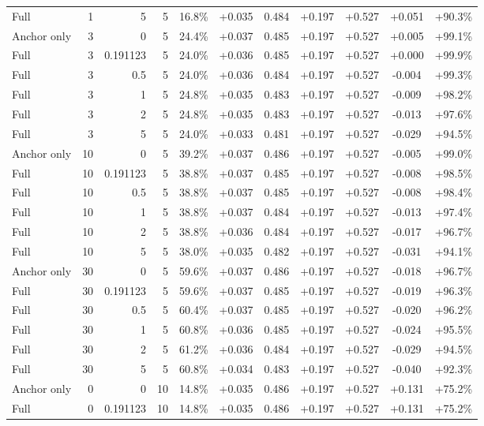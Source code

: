 \begin{table}[htbp]
\begin{tabular}{lrrrccccccc}
Full & 1 & 5 & 5 & 16.8\% & +0.035 & 0.484 & +0.197 & +0.527 & +0.051 & +90.3\% \\
Anchor only & 3 & 0 & 5 & 24.4\% & +0.037 & 0.485 & +0.197 & +0.527 & +0.005 & +99.1\% \\
Full & 3 & 0.191123 & 5 & 24.0\% & +0.036 & 0.485 & +0.197 & +0.527 & +0.000 & +99.9\% \\
Full & 3 & 0.5 & 5 & 24.0\% & +0.036 & 0.484 & +0.197 & +0.527 & -0.004 & +99.3\% \\
Full & 3 & 1 & 5 & 24.8\% & +0.035 & 0.483 & +0.197 & +0.527 & -0.009 & +98.2\% \\
Full & 3 & 2 & 5 & 24.8\% & +0.035 & 0.483 & +0.197 & +0.527 & -0.013 & +97.6\% \\
Full & 3 & 5 & 5 & 24.0\% & +0.033 & 0.481 & +0.197 & +0.527 & -0.029 & +94.5\% \\
Anchor only & 10 & 0 & 5 & 39.2\% & +0.037 & 0.486 & +0.197 & +0.527 & -0.005 & +99.0\% \\
Full & 10 & 0.191123 & 5 & 38.8\% & +0.037 & 0.485 & +0.197 & +0.527 & -0.008 & +98.5\% \\
Full & 10 & 0.5 & 5 & 38.8\% & +0.037 & 0.485 & +0.197 & +0.527 & -0.008 & +98.4\% \\
Full & 10 & 1 & 5 & 38.8\% & +0.037 & 0.484 & +0.197 & +0.527 & -0.013 & +97.4\% \\
Full & 10 & 2 & 5 & 38.8\% & +0.036 & 0.484 & +0.197 & +0.527 & -0.017 & +96.7\% \\
Full & 10 & 5 & 5 & 38.0\% & +0.035 & 0.482 & +0.197 & +0.527 & -0.031 & +94.1\% \\
Anchor only & 30 & 0 & 5 & 59.6\% & +0.037 & 0.486 & +0.197 & +0.527 & -0.018 & +96.7\% \\
Full & 30 & 0.191123 & 5 & 59.6\% & +0.037 & 0.485 & +0.197 & +0.527 & -0.019 & +96.3\% \\
Full & 30 & 0.5 & 5 & 60.4\% & +0.037 & 0.485 & +0.197 & +0.527 & -0.020 & +96.2\% \\
Full & 30 & 1 & 5 & 60.8\% & +0.036 & 0.485 & +0.197 & +0.527 & -0.024 & +95.5\% \\
Full & 30 & 2 & 5 & 61.2\% & +0.036 & 0.484 & +0.197 & +0.527 & -0.029 & +94.5\% \\
Full & 30 & 5 & 5 & 60.8\% & +0.034 & 0.483 & +0.197 & +0.527 & -0.040 & +92.3\% \\
Anchor only & 0 & 0 & 10 & 14.8\% & +0.035 & 0.486 & +0.197 & +0.527 & +0.131 & +75.2\% \\
Full & 0 & 0.191123 & 10 & 14.8\% & +0.035 & 0.486 & +0.197 & +0.527 & +0.131 & +75.2\% \\

\end{tabular}
\end{table}
